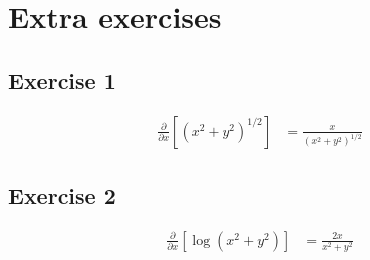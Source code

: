 \documentclass{article}
\begin{document}
\section{Extra exercises}
\subsection{Exercise 1}
\begin{align*}
    \frac{\partial}{\partial x} \left[ (x^2 + y^2)^{1/2} \right]
    &= \frac{x}{(x^2 + y^2)^{1/2}}
\end{align*}

\subsection{Exercise 2}
\begin{align*}
    \frac{\partial}{\partial x} \left[ \log (x^2 + y^2) \right]
    &= \frac{2x}{x^2 + y^2}
\end{align*}
\end{document}
